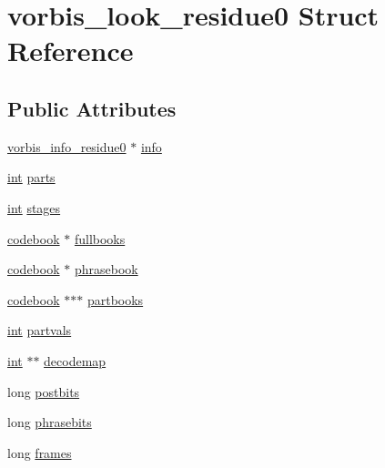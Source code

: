 \hypertarget{structvorbis__look__residue0}{}\section{vorbis\+\_\+look\+\_\+residue0 Struct Reference}
\label{structvorbis__look__residue0}
\subsection*{Public Attributes}
\begin{DoxyCompactItemize}
\item 
\hyperlink{structvorbis__info__residue0}{vorbis\+\_\+info\+\_\+residue0} $\ast$ \hyperlink{structvorbis__look__residue0_a252d1ad2f196e44467908b5047e0360b}{info}
\item 
\hyperlink{xmltok_8h_a5a0d4a5641ce434f1d23533f2b2e6653}{int} \hyperlink{structvorbis__look__residue0_a14945ea26ba740db9c5da5d5e1492677}{parts}
\item 
\hyperlink{xmltok_8h_a5a0d4a5641ce434f1d23533f2b2e6653}{int} \hyperlink{structvorbis__look__residue0_a1f6a6208d247971553c5cb4e4b176bd9}{stages}
\item 
\hyperlink{structcodebook}{codebook} $\ast$ \hyperlink{structvorbis__look__residue0_a1d93ad3c66a4321afca88cb39586cd5e}{fullbooks}
\item 
\hyperlink{structcodebook}{codebook} $\ast$ \hyperlink{structvorbis__look__residue0_ad405bb6cfed590491d1d9b54239b1356}{phrasebook}
\item 
\hyperlink{structcodebook}{codebook} $\ast$$\ast$$\ast$ \hyperlink{structvorbis__look__residue0_a762e98df374be2bdf9ce6992d96871c2}{partbooks}
\item 
\hyperlink{xmltok_8h_a5a0d4a5641ce434f1d23533f2b2e6653}{int} \hyperlink{structvorbis__look__residue0_a1f9815f5baffb975d6293b22107d2eaa}{partvals}
\item 
\hyperlink{xmltok_8h_a5a0d4a5641ce434f1d23533f2b2e6653}{int} $\ast$$\ast$ \hyperlink{structvorbis__look__residue0_a34284cd770760f95da4b2d98461682a8}{decodemap}
\item 
long \hyperlink{structvorbis__look__residue0_a40604c8d57e4c9d3af79e1d7f44ed6bb}{postbits}
\item 
long \hyperlink{structvorbis__look__residue0_affb93ccf999a975ea35d198193046980}{phrasebits}
\item 
long \hyperlink{structvorbis__look__residue0_ae8bde7a200dd22172436657d943713f6}{frames}
\end{DoxyCompactItemize}


